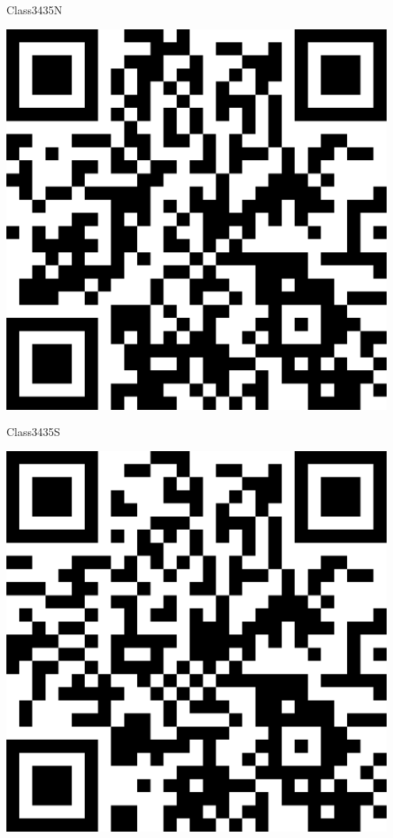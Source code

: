 \documentclass[letterpaper]{article}
\begin{document}
 \hfill{\small Class3435N} 

 \vspace{1in} 
 \pagebreak 
{} 
 \vspace*{\fill} 
 \begingroup 
 \centerline{\includegraphics[scale=1,width=5in,height=5in]{Class3435S.png}} 
 \endgroup 
 \vspace*{\fill} 

 \hfill{\small Class3435S} 

 \vspace{1in} 
 \pagebreak 
{} 
 \vspace*{\fill} 
 \begingroup 
 \centerline{\includegraphics[scale=1,width=5in,height=5in]{Class3445.png}} 
 \endgroup 
 \vspace*{\fill} 
\end{document}
